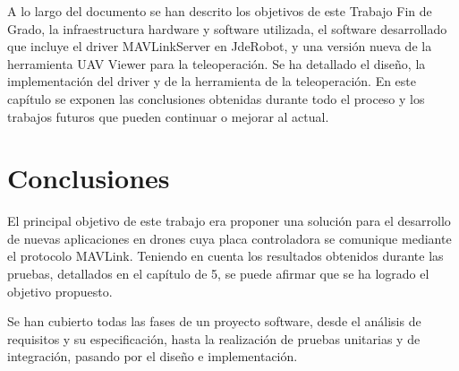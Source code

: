 A lo largo del documento se han descrito los objetivos de este Trabajo Fin de Grado, la infraestructura hardware y software utilizada, el software desarrollado que incluye el driver MAVLinkServer en JdeRobot, y una versión nueva de la herramienta UAV Viewer para la teleoperación. Se ha detallado el diseño, la implementación del driver y de la herramienta de la teleoperación. En este capítulo se exponen las conclusiones obtenidas durante todo el proceso y los trabajos futuros que pueden continuar o mejorar al actual.

\section{Conclusiones}

El principal objetivo de este trabajo era proponer una solución para el desarrollo de nuevas aplicaciones en drones cuya placa controladora se comunique mediante el protocolo MAVLink. Teniendo en cuenta los resultados obtenidos durante las pruebas, detallados en el capítulo de 5, se puede afirmar que se ha logrado el objetivo propuesto. 

Se han cubierto todas las fases de un proyecto software, desde el análisis de requisitos y su especificación, hasta la realización de pruebas unitarias y de integración, pasando por el diseño e implementación. 

